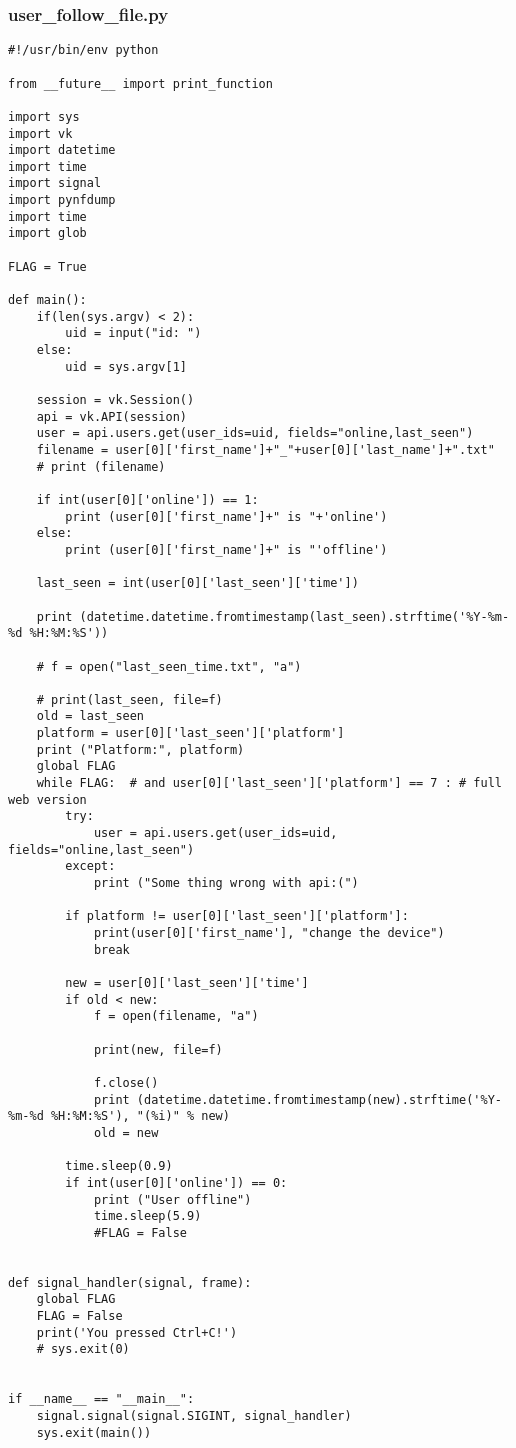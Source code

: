 \subsubsection{user{\_}follow{\_}file.py}
\begin{lstlisting}
#!/usr/bin/env python

from __future__ import print_function

import sys
import vk
import datetime
import time
import signal
import pynfdump
import time
import glob

FLAG = True

def main():
    if(len(sys.argv) < 2):
        uid = input("id: ")      
    else:
        uid = sys.argv[1]

    session = vk.Session()
    api = vk.API(session)
    user = api.users.get(user_ids=uid, fields="online,last_seen")
    filename = user[0]['first_name']+"_"+user[0]['last_name']+".txt"
    # print (filename)

    if int(user[0]['online']) == 1:
        print (user[0]['first_name']+" is "+'online')
    else:
        print (user[0]['first_name']+" is "'offline')

    last_seen = int(user[0]['last_seen']['time'])

    print (datetime.datetime.fromtimestamp(last_seen).strftime('%Y-%m-%d %H:%M:%S'))

    # f = open("last_seen_time.txt", "a")

    # print(last_seen, file=f)
    old = last_seen
    platform = user[0]['last_seen']['platform']
    print ("Platform:", platform)
    global FLAG
    while FLAG:  # and user[0]['last_seen']['platform'] == 7 : # full web version
        try:
            user = api.users.get(user_ids=uid, fields="online,last_seen")
        except:
            print ("Some thing wrong with api:(")

        if platform != user[0]['last_seen']['platform']:
            print(user[0]['first_name'], "change the device")
            break

        new = user[0]['last_seen']['time']
        if old < new:
            f = open(filename, "a")

            print(new, file=f)

            f.close()
            print (datetime.datetime.fromtimestamp(new).strftime('%Y-%m-%d %H:%M:%S'), "(%i)" % new)
            old = new

        time.sleep(0.9)
        if int(user[0]['online']) == 0:
            print ("User offline")
            time.sleep(5.9)
            #FLAG = False


def signal_handler(signal, frame):
    global FLAG
    FLAG = False
    print('You pressed Ctrl+C!')
    # sys.exit(0)


if __name__ == "__main__":
    signal.signal(signal.SIGINT, signal_handler)
    sys.exit(main())

\end{lstlisting}
